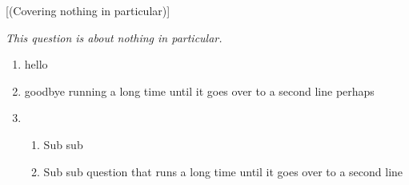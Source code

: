 \documentclass{ouab}
\begin{document}
\maketitle

%
%
%
%
%
%

[(Covering nothing in particular)]

\emph{This question is about nothing in particular.}
\begin{enumerate}
\item hello
\item goodbye running a long time until it goes over to a second line perhaps
\item 
\begin{enumerate}
\item Sub sub
\item Sub sub question that runs a long time until it goes over to a second line
\end{enumerate}
\end{enumerate}
\end{document}
